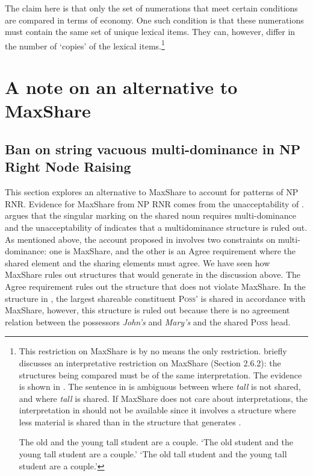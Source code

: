 \documentclass[output=paper]{langscibook}
\begin{document}
The claim here is that only the set of numerations that meet certain conditions are compared in terms of economy. One such condition is that these numerations must contain the same set of unique lexical items. They can, however, differ in the number of `copies' of the lexical items.\footnote{This restriction on MaxShare is by no means the only restriction. \citet{Shen:2018a} briefly discusses an interpretative restriction on MaxShare (Section 2.6.2):  the structures being compared must be of the same interpretation. The evidence is shown in . The sentence in  is ambiguous between  where \textit{tall} is not shared, and  where \textit{tall} is shared. If MaxShare does not care about interpretations, the interpretation in  should not be available since it involves a structure where less material is shared than in the structure that generates .

\ea 
	\label{shenftn8exi}
	The old and the young tall student are a couple.
	\ea 
		\label{shenftn8exi:a}
		`The old student and the young tall student are a couple.'
	\ex 
		\label{shenftn8exi:b}
		`The old tall student and the young tall student are a couple.'
	\z 
\z 
}


\section{A note on an alternative to MaxShare}
\label{shensect:alternatives}

\subsection{Ban on string vacuous multi-dominance in NP Right Node Raising}
\label{shensect:ban}

This section explores an alternative to MaxShare to account for patterns of NP RNR. Evidence for MaxShare from NP RNR comes from the unacceptability of . \citet{Shen:2018a} argues that the singular marking on the shared noun requires multi-dominance and the unacceptability of  indicates that a multidominance structure is ruled out. As mentioned above, the account proposed in \citet{Shen:2018a} involves two constraints on multi-dominance: one is MaxShare, and the other is an Agree requirement where the shared element and the sharing elements must agree. We have seen how MaxShare rules out structures that would generate  in the discussion above. The Agree requirement rules out the structure that does not violate MaxShare. In the structure in , the largest shareable constituent \textsc{Poss'} is shared in accordance with MaxShare, however, this structure is ruled out because there is no agreement relation between the possessors \textit{John's} and \textit{Mary's} and the shared \textsc{Poss} head.
\end{document}
